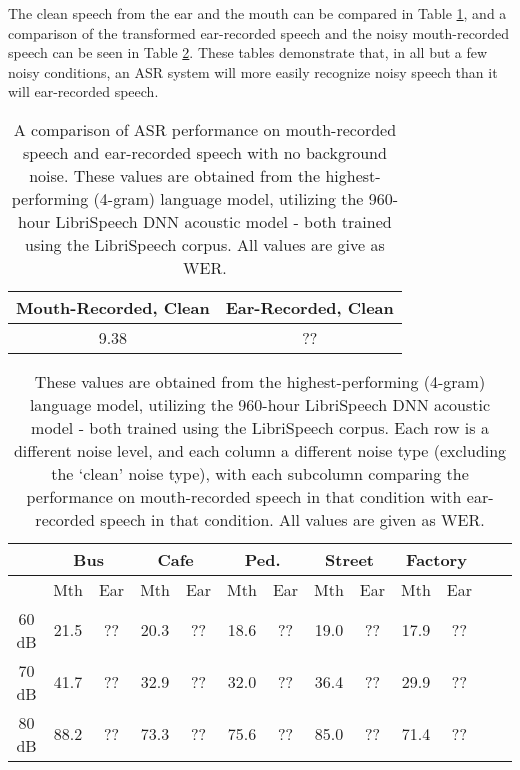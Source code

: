 The clean speech from the ear and the mouth can be compared in Table \ref{tab:clean-wers}, and a comparison of the transformed ear-recorded speech and the noisy mouth-recorded speech can be seen in Table \ref{tab:disc-all-wers}.  These tables demonstrate that, in all but a few noisy conditions, an ASR system will more easily recognize noisy speech than it will ear-recorded speech.  

\begin{table}[h]
\begin{center}
\begin{tabular}{| c | c |} \hline
 Mouth-Recorded, Clean & Ear-Recorded, Clean \\ \hline\hline
 9.38 & ?? \\ \hline
\end{tabular}
\end{center}
\caption{A comparison of ASR performance on mouth-recorded speech and ear-recorded speech with no background noise. These values are obtained from the highest-performing (4-gram) language model, utilizing the 960-hour LibriSpeech DNN acoustic model - both trained using the LibriSpeech corpus.  All values are give as WER.}\label{tab:clean-wers}
\end{table}


\begin{table}[h]
\begin{center}
\begin{tabular}{| c || c | c | c | c | c | c | c | c | c | c | c | c |} \hline
      & \multicolumn{2}{|c|}{Bus} & \multicolumn{2}{|c|}{Cafe} & \multicolumn{2}{|c|}{Ped.} & \multicolumn{2}{|c|}{Street} & \multicolumn{2}{|c|}{Factory} \\ \hline
      & Mth & Ear & Mth & Ear & Mth & Ear & Mth & Ear & Mth & Ear \\ \hline\hline
60 dB & 21.5 & ?? & 20.3 & ?? & 18.6 & ?? & 19.0 & ?? & 17.9 & ??  \\ \hline
70 dB & 41.7 & ?? & 32.9 & ?? & 32.0 & ?? & 36.4 & ?? & 29.9 & ??  \\ \hline
80 dB & 88.2 & ?? & 73.3 & ?? & 75.6 & ?? & 85.0 & ?? & 71.4 & ??  \\ \hline
\end{tabular}
\end{center}
\caption{These values are obtained from the highest-performing (4-gram) language model, utilizing the 960-hour LibriSpeech DNN acoustic model - both trained using the LibriSpeech corpus.  Each row is a different noise level, and each column a different noise type (excluding the `clean' noise type), with each subcolumn comparing the performance on mouth-recorded speech in that condition with ear-recorded speech in that condition.  All values are given as WER.}\label{tab:disc-all-wers}
\end{table}

